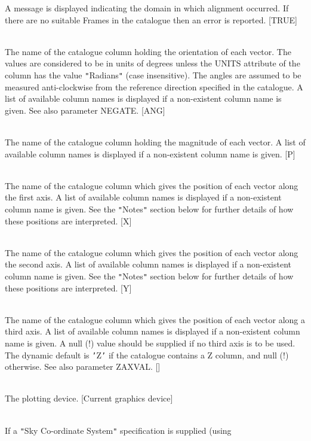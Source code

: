 \documentclass[twoside,11pt]{article}
\renewcommand{\_}{\texttt{\symbol{95}}}
\newcommand{\sstsubsection}[1]{ \item[{#1}] \mbox{} \\}
\newcommand{\sstsubsection}[1]{\item[{#1}]}
\begin{document}
{{{         A message is displayed indicating the domain in which alignment
         occurred. If there are no suitable Frames in the catalogue then an
         error is reported. [TRUE]
      }
      \sstsubsection{
         COLANG = LITERAL (Read)
      }{
         The name of the catalogue column holding the orientation of each
         vector. The values are considered to be in units of degrees unless
         the UNITS attribute of the column has the value {\tt "}Radians{\tt "} (case
         insensitive).  The angles are assumed to be measured anti-clockwise
         from the reference direction specified in the catalogue. A list
         of available column names is displayed if a non-existent column name
         is given. See also parameter NEGATE. [ANG]
      }
      \sstsubsection{
         COLMAG = LITERAL (Read)
      }{
         The name of the catalogue column holding the magnitude of each
         vector. A list of available column names is displayed if a
         non-existent column name is given. [P]
      }
      \sstsubsection{
         COLX = LITERAL (Read)
      }{
         The name of the catalogue column which gives the position of each
         vector along the first axis. A list of available column names is
         displayed if a non-existent column name is given. See the {\tt "}Notes{\tt "}
         section below for further details of how these positions are
         interpreted. [X]
      }
      \sstsubsection{
         COLY = LITERAL (Read)
      }{
         The name of the catalogue column which gives the position of each
         vector along the second axis. A list of available column names is
         displayed if a non-existent column name is given. See the {\tt "}Notes{\tt "}
         section below for further details of how these positions are
         interpreted. [Y]
      }
      \sstsubsection{
         COLZ = LITERAL (Read)
      }{
         The name of the catalogue column which gives the position of each
         vector along a third axis. A list of available column names is
         displayed if a non-existent column name is given. A null (!)
         value should be supplied if no third axis is to be used. The dynamic
         default is {\tt '}Z{\tt '} if the catalogue contains a Z column, and null
         (!) otherwise. See also parameter ZAXVAL. []
      }
      \sstsubsection{
         DEVICE = DEVICE (Read)
      }{
         The plotting device. [Current graphics device]
      }
      \sstsubsection{
         EPOCH = \_DOUBLE (Read)
      }{
         If a {\tt "}Sky Co-ordinate System{\tt "} specification is supplied (using
}}}
\end{document}
